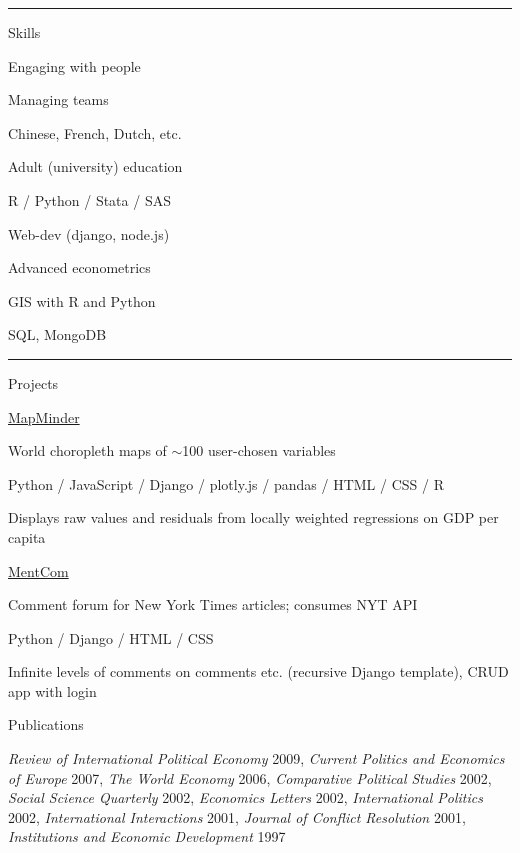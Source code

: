 \documentclass[letterpaper, english, 11pt]{article}
\newenvironment{packed_itemize}{
	\begin{itemize}
		\setlength{\itemsep}{1pt}
		\setlength{\parskip}{2pt}
		\setlength{\parsep}{2pt}
	} {\end{itemize}
}
\begin{document}
\hrule
 
Skills

\begin{footnotesize}
\begin{multicols}{3}
	\begin{packed_itemize}
		\item Engaging with people
		\item Managing teams
		\item Chinese, French, Dutch, etc.
		\item Adult (university) education
		\item R / Python / Stata / SAS
		\item Web-dev (django, node.js)
		\item Advanced econometrics
		\item GIS with R and Python
		\item SQL, MongoDB
	\end{packed_itemize}
\end{multicols}
\end{footnotesize}
\vspace{2pt}
\hrule

Projects

\begin{footnotesize}
	\begin{packed_itemize}
		\item{\href{https://github.com/rsspdx/mapminder}{MapMinder}}
			\begin{packed_itemize}
				\item World choropleth maps of $\sim$100 user-chosen variables
				\item Python / JavaScript  / Django / plotly.js / pandas / HTML / CSS / R
				\item Displays raw values and residuals from locally weighted regressions on GDP per capita
			\end{packed_itemize}
		\item{\href{https://github.com/rsspdx/mentcom}{MentCom}}
			\begin{packed_itemize}
				\item Comment forum for New York Times articles; consumes NYT API
				\item Python / Django / HTML / CSS
				\item Infinite levels of comments on comments etc. (recursive Django template), CRUD app with login
			\end{packed_itemize}
		\item{Publications}
			\begin{packed_itemize}
			\item  \emph{Review of International Political Economy} 2009, 
				\emph{Current Politics and Economics of Europe} 2007, 
				\emph{The World Economy} 2006, 
				\emph{Comparative Political Studies} 2002, 
				\emph{Social Science Quarterly} 2002, 
				\emph{Economics Letters} 2002, 
				\emph{International Politics} 2002, 
				\emph{International Interactions} 2001, 
				\emph{Journal of Conflict Resolution} 2001, 
				\emph{Institutions and Economic Development} 1997
		\end{packed_itemize}
	\end{packed_itemize}
\end{footnotesize}
\end{document}
